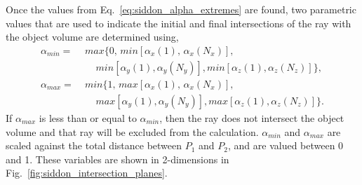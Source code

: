 Once the values from Eq.~\ref{eq:siddon_alpha_extremes} are found, two parametric values that are used to indicate the initial and final intersections of the ray with the object volume are determined using,
%
\begin{equation}
\begin{aligned}
\alpha_{min} = \; & max\{ 0, \, min \left[ \alpha_x(1), \, \alpha_x(N_x) \right], \\
               & \; \; \; \; min \left[ \alpha_y(1), \alpha_y(N_y) \right], min \left[ \alpha_z(1), \alpha_z (N_z) \right] \}, \\
\alpha_{max} = \; & min\{1, \, max \left[ \alpha_x(1), \, \alpha_x(N_x) \right], \\
			   & \; \; \; \; max \left[ \alpha_y(1), \alpha_y(N_y) \right], max \left[ \alpha_z(1), \alpha_z (N_z) \right] \}.
\end{aligned}
\label{eq:siddon_alpha_min_max}
\end{equation}
%
If $\alpha_{max}$ is less than or equal to $\alpha_{min}$, then the ray does not intersect the object volume and that ray will be excluded from the calculation.  $\alpha_{min}$ and $\alpha_{max}$ are scaled against the total distance between $P_1$ and $P_2$, and are valued between 0 and 1.  These variables are shown in 2-dimensions in Fig.~\ref{fig:siddon_intersection_planes}.

